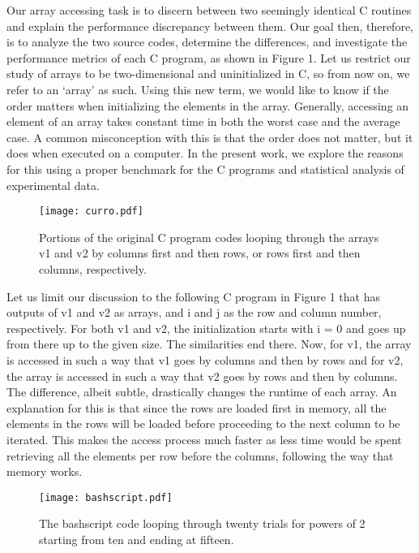 \documentclass[a4paper]{article}
\begin{document}
Our array accessing task is to discern between two seemingly identical C routines and explain the performance discrepancy between them. Our goal then, therefore, is to analyze the two source codes, determine the differences, and investigate the performance metrics of each C program, as shown in Figure 1. Let us restrict our study of arrays to be two-dimensional and uninitialized in C, so from now on, we refer to an ‘array’ as such. Using this new term, we would like to know if the order matters when initializing the elements in the array. Generally, accessing an element of an array takes constant time in both the worst case and the average case. A common misconception with this is that the order does not matter, but it does when executed on a computer. In the present work, we explore the reasons for this using a proper benchmark for the C programs and statistical analysis of experimental data. 

\begin{figure}[H]
\centering
\texttt{[image: curro.pdf]}
\caption{\label{fig:bashscript}Portions of the original C program codes looping through the arrays v1 and v2 by columns first and then rows, or rows first and then columns, respectively.}
\end{figure}

Let us limit our discussion to the following C program in Figure 1 that has outputs of v1 and v2 as arrays, and i and j as the row and column number, respectively. For both v1 and v2, the initialization starts with i = 0 and goes up from there up to the given size. The similarities end there. Now, for v1, the array is accessed in such a way that v1 goes by columns and then by rows and for v2, the array is accessed in such a way that v2 goes by rows and then by columns. The difference, albeit subtle, drastically changes the runtime of each array. An explanation for this is that since the rows are loaded first in memory, all the elements in the rows will be loaded before proceeding to the next column to be iterated. This makes the access process much faster as less time would be spent retrieving all the elements per row before the columns, following the way that memory works.

\begin{figure}[H]
\centering
\texttt{[image: bashscript.pdf]}
\caption{\label{fig:bashscript}The bashscript code looping through twenty trials for powers of 2 starting from ten and ending at fifteen.}
\end{figure}
\end{document}
